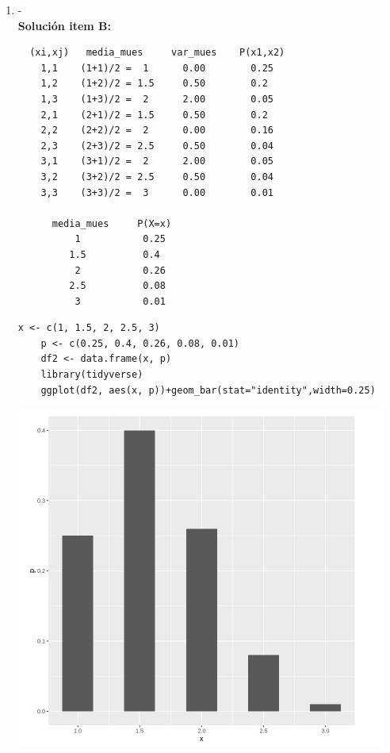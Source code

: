 \begin{enumerate}

    \item-
    \\
    \textbf{Solución item B:}
    \begin{verbatim}
  (xi,xj)   media_mues     var_mues    P(x1,x2)
    1,1    (1+1)/2 =  1      0.00        0.25
    1,2    (1+2)/2 = 1.5     0.50        0.2
    1,3    (1+3)/2 =  2      2.00        0.05
    2,1    (2+1)/2 = 1.5     0.50        0.2
    2,2    (2+2)/2 =  2      0.00        0.16
    2,3    (2+3)/2 = 2.5     0.50        0.04
    3,1    (3+1)/2 =  2      2.00        0.05
    3,2    (3+2)/2 = 2.5     0.50        0.04
    3,3    (3+3)/2 =  3      0.00        0.01
    
      media_mues     P(X=x)
          1           0.25
         1.5          0.4
          2           0.26
         2.5          0.08
          3           0.01
    \end{verbatim}
    
    \begin{lstlisting}[frame=single]
    x <- c(1, 1.5, 2, 2.5, 3)
    p <- c(0.25, 0.4, 0.26, 0.08, 0.01)
    df2 <- data.frame(x, p)
    library(tidyverse)
    ggplot(df2, aes(x, p))+geom_bar(stat="identity",width=0.25)
    \end{lstlisting}
    
    \includegraphics[scale=0.8]{img/m_muest.png}

\end{enumerate}